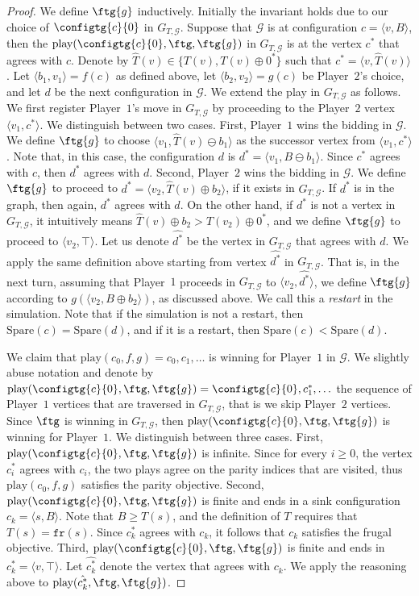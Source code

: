 \documentclass{theoretics}
\newcommand{\PO}{Player~$1$\xspace}
\newcommand{\PT}{Player~$2$\xspace}
\newcommand{\G}{{\mathcal G}}
\newcommand{\fr}{\texttt{fr}}
\newcommand{\play}{\text{play}\xspace}
\newcommand{\Spare}{\text{Spare}\xspace}
\newcommand{\zug}[1]{\langle #1  \rangle}
\newcommand{\succb}[1]{#1 \oplus 0^*\xspace}
\newcommand{\placeholdr}{\hat{T}(v)}
\begin{document}
\begin{proof}
	We define \(\ftg{g}\) inductively. 
Initially the invariant holds due to our choice of \(\configtg{c}{0}\) in \(G_{T, \G}\). 
	Suppose that \(\G\) is at configuration \(c = \zug{v, B}\), then the \(\play(\configtg{c}{0}, \ftg, \ftg{g})\) in  \(G_{T, \G}\) is at the vertex \(c^*\) that agrees with \(c\). 
	Denote by \(\placeholdr \in \{T(v), \succb{T(v)}\}\) such that \(c^* = \zug{v, \placeholdr}\). 
	Let \(\zug{b_1, v_1} = f(c)\) as defined above, let \(\zug{b_2, v_2} = g(c)\) be \PT's choice, and let \(d\) be the next configuration in $\G$. We extend the play in $G_{T,\G}$ as follows. 
	We first register \PO's move in \(G_{T, \G}\) by proceeding to the \PT vertex \(\zug{v_1, c^*}\). 
	We distinguish between two cases. First, \PO wins the bidding in $\G$. We define \(\ftg{g}\) to choose \(\zug{v_1, \placeholdr \ominus b_1}\) as the successor vertex from \(\zug{v_1, c^*}\). 
	Note that, in this case, the configuration \(d\) is \(d^* = \zug{v_1, B \ominus b_1}\).  
	Since \(c^*\) agrees with \(c\), then \(d^*\) agrees with \(d\). 
	Second, \PT wins the bidding in $\G$. We define \(\ftg{g}\) to proceed to \(d^* = \zug{v_2, \placeholdr \oplus b_2}\), if it exists in \(G_{T, \G}\). 
	If \(d^*\) is in the graph, then again, $d^*$ agrees with $d$. 
	On the other hand, if \(d^*\) is not a vertex in \(G_{T, \G}\), it intuitively means \(\placeholdr \oplus b_2 > \succb{T(v_2)}\), and we define \(\ftg{g}\) to proceed to \(\zug{v_2, \top}\). 
	Let us denote \(\hat{d^*}\) be the vertex in \(G_{T, \G}\) that agrees with \(d\). 
	We apply the same definition above starting from vertex \(\hat{d^*}\) in \(G_{T, \G}\). 
	That is, in the next turn, assuming that \PO proceeds in \(G_{T, \G}\) to \(\zug{v_2, \hat{d^*}}\), we define \(\ftg{g}\) according to \(g(\zug{v_2, B \oplus b_2})\), as discussed above. 
	We call this a \emph{restart} in the simulation. 
	Note that if the simulation is not a restart, then \(\Spare(c) = \Spare(d)\), and if it is a restart, then \(\Spare(c) < \Spare(d)\). 
	
	We claim that $\play(c_0, f, g) = c_0, c_1,\ldots$ is winning for \PO in $\G$. We slightly abuse notation and denote by $\play(\configtg{c}{0}, \ftg, \ftg{g}) = \configtg{c}{0}, c^*_1,\ldots$ the sequence of \PO vertices that are traversed in $G_{T, \G}$, that is we skip \PT vertices. 
	Since $\ftg$ is winning in $G_{T, \G}$, then $\play(\configtg{c}{0}, \ftg, \ftg{g})$ is winning for \PO. We distinguish between three cases. 
	First, $\play(\configtg{c}{0}, \ftg, \ftg{g})$ is infinite. Since for every $i \geq 0$, the vertex $c^*_i$ agrees with $c_i$, the two plays agree on the parity indices that are visited, thus $\play(c_0, f, g)$ satisfies the parity objective. 
	Second, $\play(\configtg{c}{0}, \ftg, \ftg{g})$ is finite and ends in a sink configuration $c_k = \zug{s, B}$. Note that $B \geq T(s)$, and the definition of $T$ requires that $T(s) = \fr(s)$. 
	Since $c^*_k$ agrees with $c_k$, it follows that $c_k$ satisfies the frugal objective. 
	Third, $\play(\configtg{c}{0}, \ftg, \ftg{g})$ is finite and ends in $c^*_k = \zug{v, \top}$. 
	Let $\hat{c^*_k}$ denote the vertex that agrees with $c_k$. 
	We apply the reasoning above to $\play(\hat{c^*_k}, \ftg, \ftg{g})$. 
	

\end{proof}
\end{document}
